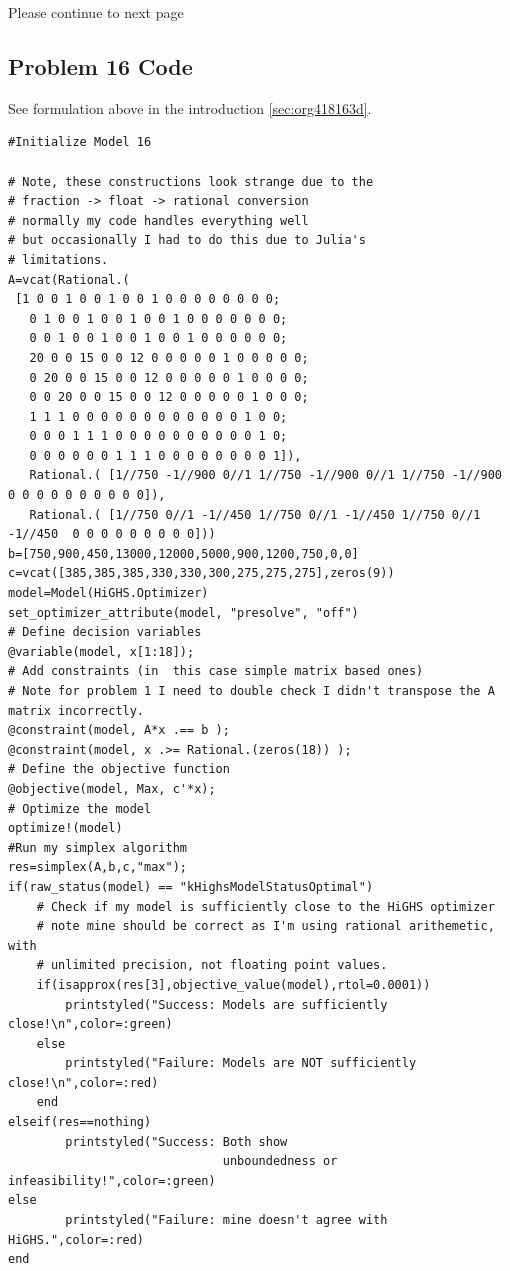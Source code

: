 \documentclass[11pt]{article}
\begin{document}
\vfill
Please continue to next page
\newpage

\subsection{Problem 16 Code}
\label{sec:org203be40}
See formulation above in the introduction \ref{sec:org418163d}.

\begin{verbatim}
#Initialize Model 16

# Note, these constructions look strange due to the
# fraction -> float -> rational conversion
# normally my code handles everything well
# but occasionally I had to do this due to Julia's
# limitations.
A=vcat(Rational.(
 [1 0 0 1 0 0 1 0 0 1 0 0 0 0 0 0 0 0;
   0 1 0 0 1 0 0 1 0 0 1 0 0 0 0 0 0 0;
   0 0 1 0 0 1 0 0 1 0 0 1 0 0 0 0 0 0;
   20 0 0 15 0 0 12 0 0 0 0 0 1 0 0 0 0 0;
   0 20 0 0 15 0 0 12 0 0 0 0 0 1 0 0 0 0;
   0 0 20 0 0 15 0 0 12 0 0 0 0 0 1 0 0 0;
   1 1 1 0 0 0 0 0 0 0 0 0 0 0 0 1 0 0;
   0 0 0 1 1 1 0 0 0 0 0 0 0 0 0 0 1 0;
   0 0 0 0 0 0 1 1 1 0 0 0 0 0 0 0 0 1]),
   Rational.( [1//750 -1//900 0//1 1//750 -1//900 0//1 1//750 -1//900 0 0 0 0 0 0 0 0 0 0]),
   Rational.( [1//750 0//1 -1//450 1//750 0//1 -1//450 1//750 0//1 -1//450  0 0 0 0 0 0 0 0 0]))
b=[750,900,450,13000,12000,5000,900,1200,750,0,0]
c=vcat([385,385,385,330,330,300,275,275,275],zeros(9))
model=Model(HiGHS.Optimizer)
set_optimizer_attribute(model, "presolve", "off")
# Define decision variables
@variable(model, x[1:18]);
# Add constraints (in  this case simple matrix based ones)
# Note for problem 1 I need to double check I didn't transpose the A matrix incorrectly.
@constraint(model, A*x .== b );
@constraint(model, x .>= Rational.(zeros(18)) );
# Define the objective function
@objective(model, Max, c'*x);
# Optimize the model
optimize!(model)
#Run my simplex algorithm
res=simplex(A,b,c,"max");
if(raw_status(model) == "kHighsModelStatusOptimal")
    # Check if my model is sufficiently close to the HiGHS optimizer
    # note mine should be correct as I'm using rational arithemetic, with
    # unlimited precision, not floating point values.
    if(isapprox(res[3],objective_value(model),rtol=0.0001))
        printstyled("Success: Models are sufficiently close!\n",color=:green)
    else
        printstyled("Failure: Models are NOT sufficiently close!\n",color=:red)
    end
elseif(res==nothing)
        printstyled("Success: Both show
                              unboundedness or infeasibility!",color=:green)
else
        printstyled("Failure: mine doesn't agree with HiGHS.",color=:red)
end
\end{verbatim}
\end{document}
